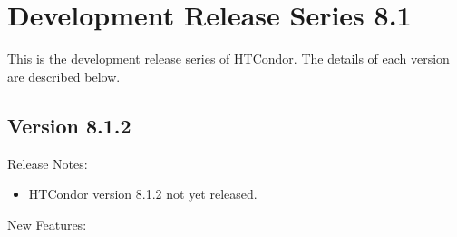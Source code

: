
\section{\label{sec:History-8-1}Development Release Series 8.1}

This is the development release series of HTCondor.
The details of each version are described below.

\subsection*{\label{sec:New-8-1-2}Version 8.1.2}

\noindent Release Notes:

\begin{itemize}

\item HTCondor version 8.1.2 not yet released.

\end{itemize}


\noindent New Features:

